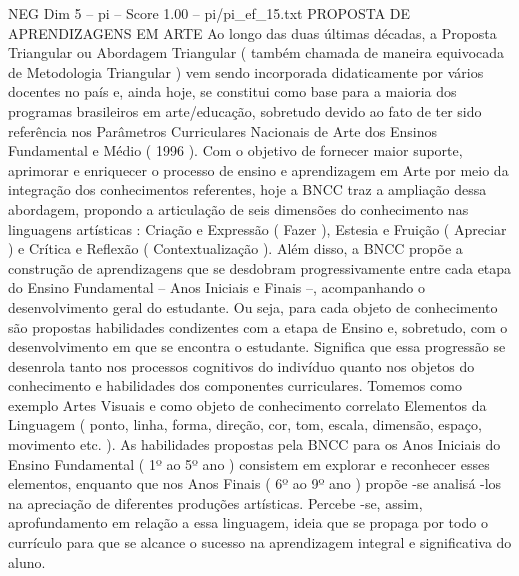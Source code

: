 \begin{textsample}{NEG Dim 5 – pi – Score 1.00 – pi/pi\_ef\_15.txt}  \label{ex:f5_neg_059}
PROPOSTA DE APRENDIZAGENS EM ARTE Ao longo das duas últimas décadas, a Proposta Triangular ou Abordagem Triangular ( também chamada de maneira equivocada de Metodologia Triangular ) vem sendo incorporada didaticamente por vários docentes no país e, ainda hoje, se constitui como base para a maioria dos programas brasileiros em arte/educação, sobretudo devido ao fato de ter sido referência nos Parâmetros Curriculares Nacionais de Arte dos Ensinos Fundamental e Médio ( 1996 ).
Com o objetivo de fornecer maior suporte, aprimorar e enriquecer o processo de ensino e aprendizagem em Arte por meio da integração dos conhecimentos referentes, hoje a BNCC traz a ampliação dessa abordagem, propondo a articulação de seis dimensões do conhecimento nas linguagens artísticas : Criação e Expressão ( Fazer ), Estesia e Fruição ( Apreciar ) e Crítica e Reflexão ( Contextualização ).
Além disso, a BNCC propõe a construção de aprendizagens que se desdobram progressivamente entre cada etapa do Ensino Fundamental – Anos Iniciais e Finais –, acompanhando o desenvolvimento geral do estudante.
Ou seja, para cada objeto de conhecimento são propostas habilidades condizentes com a etapa de Ensino e, sobretudo, com o desenvolvimento em que se encontra o estudante.
Significa que essa progressão se desenrola tanto nos processos cognitivos do indivíduo quanto nos objetos do conhecimento e habilidades dos componentes curriculares.
Tomemos como exemplo Artes Visuais e como objeto de conhecimento correlato Elementos da Linguagem ( ponto, linha, forma, direção, cor, tom, escala, dimensão, espaço, movimento etc. ).
As habilidades propostas pela BNCC para os Anos Iniciais do Ensino Fundamental ( 1º ao 5º ano ) consistem em explorar e reconhecer esses elementos, enquanto que nos Anos Finais ( 6º ao 9º ano ) propõe -se analisá -los na apreciação de diferentes produções artísticas.
Percebe -se, assim, aprofundamento em relação a essa linguagem, ideia que se propaga por todo o currículo para que se alcance o sucesso na aprendizagem integral e significativa do aluno.

\end{textsample}
